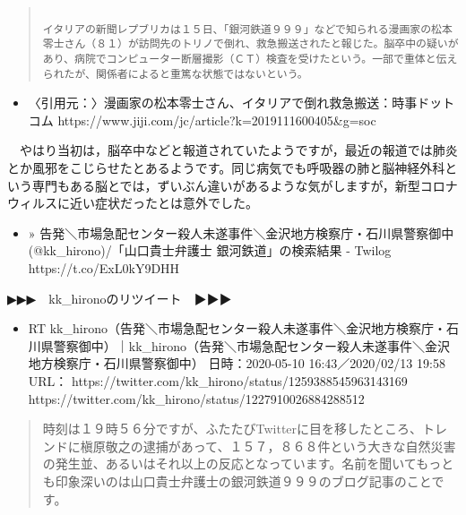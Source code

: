 \documentclass[]{ltjarticle}
\providecommand{\tightlist}{%
  \setlength{\itemsep}{0pt}\setlength{\parskip}{0pt}}
\begin{document}
\begingroup\fontsize{9pt}{10pt}\selectfont
\begin{quote}
\begin{verbatim}

イタリアの新聞レプブリカは１５日、「銀河鉄道９９９」などで知られる漫画家の松本零士さん（８１）が訪問先のトリノで倒れ、救急搬送されたと報じた。脳卒中の疑いがあり、病院でコンピューター断層撮影（ＣＴ）検査を受けたという。一部で重体と伝えられたが、関係者によると重篤な状態ではないという。

\end{verbatim}
\end{quote}\endgroup


\begin{itemize}
\tightlist
\item
  〈引用元：〉漫画家の松本零士さん、イタリアで倒れ救急搬送：時事ドットコム
  https://www.jiji.com/jc/article?k=2019111600405\&g=soc
\end{itemize}

　やはり当初は，脳卒中などと報道されていたようですが，最近の報道では肺炎とか風邪をこじらせたとあるようです。同じ病気でも呼吸器の肺と脳神経外科という専門もある脳とでは，ずいぶん違いがあるような気がしますが，新型コロナウィルスに近い症状だったとは意外でした。

\begin{itemize}
\tightlist
\item
  »
  告発＼市場急配センター殺人未遂事件＼金沢地方検察庁・石川県警察御中(@kk\_hirono)/「山口貴士弁護士
  銀河鉄道」の検索結果 - Twilog https://t.co/ExL0kY9DHH
\end{itemize}

▶▶▶　kk\_hironoのリツイート　▶▶▶

\begin{itemize}
\tightlist
\item
  RT
  kk\_hirono（告発＼市場急配センター殺人未遂事件＼金沢地方検察庁・石川県警察御中）｜kk\_hirono（告発＼市場急配センター殺人未遂事件＼金沢地方検察庁・石川県警察御中）
  日時：2020-05-10 16:43／2020/02/13 19:58 URL：
  https://twitter.com/kk\_hirono/status/1259388545963143169
  https://twitter.com/kk\_hirono/status/1227910026884288512
\end{itemize}

\begin{quote}
時刻は１９時５６分ですが、ふたたびTwitterに目を移したところ、トレンドに槇原敬之の逮捕があって、１５７，８６８件という大きな自然災害の発生並、あるいはそれ以上の反応となっています。名前を聞いてもっとも印象深いのは山口貴士弁護士の銀河鉄道９９９のブログ記事のことです。
\end{quote}
\end{document}
